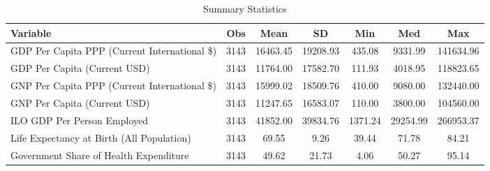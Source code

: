 \begin{table}
\centering
\caption{Summary Statistics}
\label{Sum_Stats}
\begin{tabular}{lcccccc}
\toprule
                                    Variable &  Obs &     Mean &       SD &     Min &      Med &       Max \\
\midrule
GDP Per Capita PPP (Current International \$) & 3143 & 16463.45 & 19208.93 & 435.08 & 9331.99 & 141634.96 \\
GDP Per Capita (Current USD) & 3143 & 11764.00 & 17582.70 & 111.93 & 4018.95 & 118823.65 \\
GNP Per Capita PPP (Current International \$) & 3143 & 15999.02 & 18509.76 & 410.00 & 9080.00 & 132440.00 \\
GNP Per Capita (Current USD) & 3143 & 11247.65 & 16583.07 & 110.00 & 3800.00 & 104560.00 \\
ILO GDP Per Person Employed & 3143 & 41852.00 & 39834.76 & 1371.24 & 29254.99 & 266953.37 \\
Life Expectancy at Birth (All Population) & 3143 & 69.55 & 9.26 & 39.44 & 71.78 & 84.21 \\
Government Share of Health Expenditure & 3143 & 49.62 & 21.73 & 4.06 & 50.27 & 95.14 \\
\bottomrule
\end{tabular}
\end{table}

